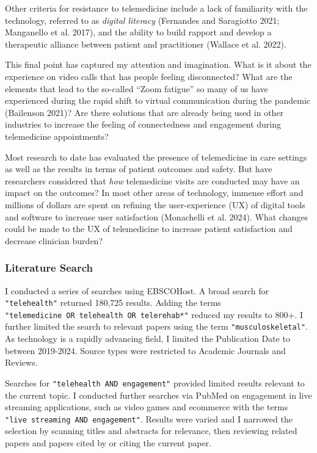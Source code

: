 \documentclass[
  letterpaper,
  DIV=11,
  numbers=noendperiod,
  oneside]{scrartcl}
\begin{document}
Other criteria for resistance to telemedicine include a lack of
familiarity with the technology, referred to as \emph{digital literacy}
(Fernandes and Saragiotto 2021; Manganello et al. 2017), and the ability
to build rapport and develop a therapeutic alliance between patient and
practitioner (Wallace et al. 2022).

This final point has captured my attention and imagination. What is it
about the experience on video calls that has people feeling
disconnected? What are the elements that lead to the so-called ``Zoom
fatigue'' so many of us have experienced during the rapid shift to
virtual communication during the pandemic (Bailenson 2021)? Are there
solutions that are already being used in other industries to increase
the feeling of connectedness and engagement during telemedicine
appointments?

Most research to date has evaluated the presence of telemedicine in care
settings as well as the results in terms of patient outcomes and safety.
But have researchers considered that \emph{how} telemedicine visits are
conducted may have an impact on the outcomes? In most other areas of
technology, immense effort and millions of dollars are spent on refining
the user-experience (UX) of digital tools and software to increase user
satisfaction (Monachelli et al. 2024). What changes could be made to the
UX of telemedicine to increase patient satisfaction and decrease
clinician burden?

\subsubsection{Literature Search}\label{literature-search}

I conducted a series of searches using EBSCOHost. A broad search for
\texttt{"telehealth"} returned 180,725 results. Adding the terms
\texttt{"telemedicine\ OR\ telehealth\ OR\ telerehab*"} reduced my
results to 800+. I further limited the search to relevant papers using
the term \texttt{"musculoskeletal"}. As technology is a rapidly
advancing field, I limited the Publication Date to between 2019-2024.
Source types were restricted to Academic Journals and Reviews.

Searches for \texttt{"telehealth\ AND\ engagement"} provided limited
results relevant to the current topic. I conducted further searches via
PubMed on engagement in live streaming applications, such as video games
and ecommerce with the terms
\texttt{"live\ streaming\ AND\ engagement"}. Results were varied and I
narrowed the selection by scanning titles and abstracts for relevance,
then reviewing related papers and papers cited by or citing the current
paper.
\end{document}
